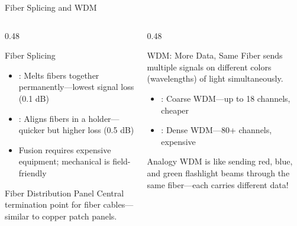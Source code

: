 \documentclass[aspectratio=169]{beamer}  %
\begin{document}
\begin{frame}{Fiber Splicing and WDM}
    \begin{columns}[T]
        \begin{column}{0.48\textwidth}
            \begin{block}{Fiber Splicing}
                \begin{itemize}
                    \item {}: Melts fibers together permanently---lowest signal loss (0.1 dB)
                    \item {}: Aligns fibers in a holder---quicker but higher loss (0.5 dB)
                    \item Fusion requires expensive equipment; mechanical is field-friendly
                \end{itemize}
            \end{block}
            
            \vspace{0.3em}
            \begin{block}{Fiber Distribution Panel}
                Central termination point for fiber cables---similar to copper patch panels.
            \end{block}
        \end{column}
        \begin{column}{0.48\textwidth}
            \begin{block}{WDM: More Data, Same Fiber}
                 sends multiple signals on different colors (wavelengths) of light simultaneously.
                
                \vspace{0.3em}
                \begin{itemize}
                    \item {}: Coarse WDM---up to 18 channels, cheaper
                    \item {}: Dense WDM---80+ channels, expensive
                \end{itemize}
            \end{block}
            
            \vspace{0.3em}
            \begin{exampleblock}{Analogy}
                WDM is like sending red, blue, and green flashlight beams through the same fiber---each carries different data!
            \end{exampleblock}
        \end{column}
    \end{columns}
\end{frame}
\end{document}
